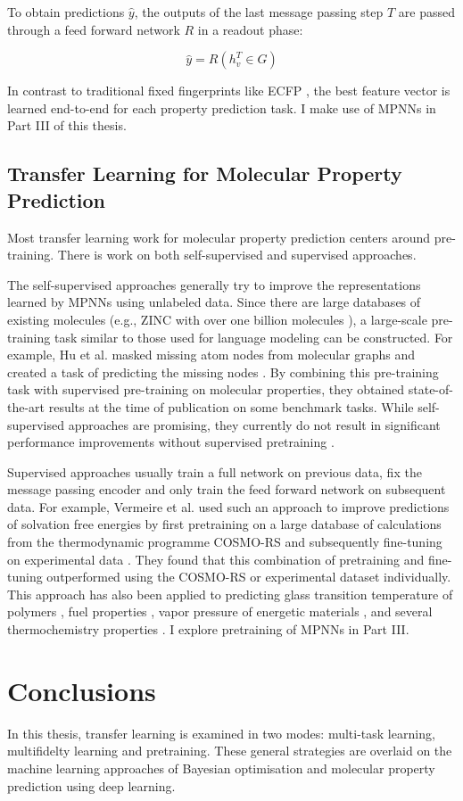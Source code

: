 To obtain predictions $\hat y$, the outputs of the last message passing step $T$ are passed through a feed forward network $R$ in a readout phase:

\begin{equation}
    \hat y = R(h_v^T \in G)
\end{equation}

In contrast to traditional fixed fingerprints like ECFP \cite{Rogers2010}, the best feature vector is learned end-to-end for each property prediction task. I make use of MPNNs in Part III of this thesis.

\subsection{Transfer Learning for Molecular Property Prediction}

Most transfer learning work for molecular property prediction centers around pre-training. There is work on both self-supervised and supervised approaches.

The self-supervised approaches generally try to improve the representations learned by MPNNs using unlabeled data. Since there are large databases of existing molecules (e.g., ZINC with over one billion molecules \cite{Irwin2020}), a large-scale pre-training task similar to those used for language modeling can be constructed. For example, Hu et al. masked missing atom nodes from molecular graphs and created a task of predicting the missing nodes \cite{Hu2020Pretrain}. By combining this pre-training task with supervised pre-training on molecular properties, they obtained state-of-the-art results at the time of publication on some benchmark tasks. While self-supervised approaches are promising, they currently do not result in significant performance improvements without supervised pretraining \cite{Sun2022}.

Supervised approaches usually train a full network on previous data, fix the message passing encoder and only train the feed forward network on subsequent data. For example, Vermeire et al. used such an approach to improve predictions of solvation free energies by first pretraining on a large database of calculations from the thermodynamic programme COSMO-RS and subsequently fine-tuning on experimental data \cite{Vermeire2021, Vermeire2022}. They found that this combination of pretraining and fine-tuning outperformed using the COSMO-RS or experimental dataset individually. This approach has also been applied to predicting glass transition temperature of polymers \cite{Volgin2022}, fuel properties \cite{Larsson2023}, vapor pressure of energetic materials \cite{Lansford2023}, and several thermochemistry properties \cite{Grambow2019, Ureel2023}. I explore pretraining of MPNNs in Part III.

\section{Conclusions}

In this thesis, transfer learning is examined in two modes: multi-task learning, multifidelty learning and pretraining. These general strategies are overlaid on the machine learning approaches of Bayesian optimisation and molecular property prediction using deep learning. 